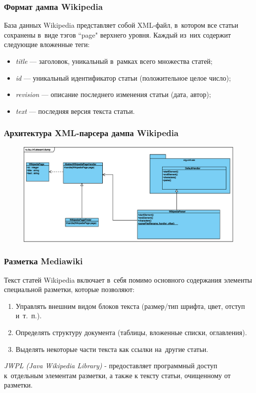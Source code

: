 \documentclass{beamer}
\begin{document}
\begin{frame}
\frametitle{Формат дампа Wikipedia}
База данных Wikipedia представляет собой XML-файл, в~котором
все статьи сохранены в~виде тэгов ``page" верхнего уровня. 
Каждый из~них содержит следующие вложенные теги:

\begin{itemize}
\item{{\it title} --- заголовок, уникальный в~рамках всего множества статей;}
\item{{\it id} --- уникальный идентификатор статьи (положительное целое число);}
\item{{\it revision} --- описание последнего изменения статьи (дата, автор);}
\item{{\it text} --- последняя версия текста статьи.}
\end{itemize}
\end{frame}

\begin{frame}
\frametitle{Архитектура XML-парсера дампа Wikipedia}
\begin{figure}
\begin{center}
\includegraphics[scale=0.39]{../eps/ru.tsu.inf.atexant.dump.eps}
\end{center}
\end{figure}
\end{frame}

\begin{frame}
\frametitle{Разметка Mediawiki}

Текст статей Wikipedia включает в~себя помимо основного содержания элементы специальной разметки, которые позволяют:

\begin{enumerate}

\item{Управлять внешним видом блоков текста (размер/тип шрифта, цвет, отступ и~т.~п.).}
\item{Определять структуру документа (таблицы, вложенные списки, оглавления).}
\item{Выделять некоторые части текста как ссылки на~другие статьи.}

\end{enumerate}

{\it JWPL (Java Wikipedia Library) } - 
предоставляет программный доступ к~отдельным элементам разметки,
а также к тексту статьи, очищенному от разметки.
\end{frame}
\end{document}
